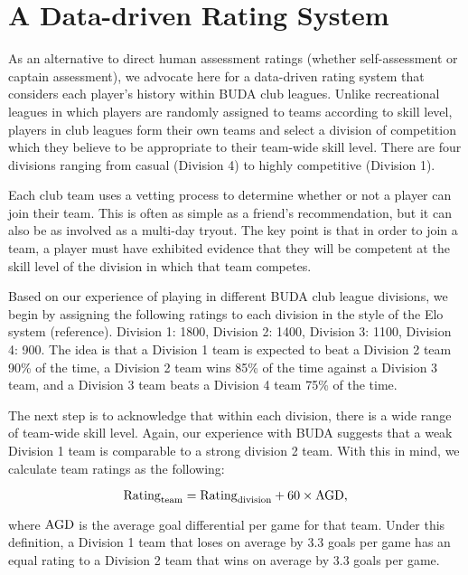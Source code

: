 \section{A Data-driven Rating System}\label{sec:club_rating}

As an alternative to direct human assessment ratings (whether self-assessment or captain assessment), we advocate here for a data-driven rating system that considers each player's history within BUDA club leagues. Unlike recreational leagues in which players are randomly assigned to teams according to skill level, players in club leagues form their own teams and select a division of competition which they believe to be appropriate to their team-wide skill level.  There are four divisions ranging from casual (Division 4) to highly competitive (Division 1).  

Each club team uses a vetting process to determine whether or not a player can join their team. This is often as simple as a friend's recommendation, but it can also be as involved as a multi-day tryout. The key point is that in order to join a team, a player must have exhibited evidence that they will be competent at the skill level of the division in which that team competes.

Based on our experience of playing in different BUDA club league divisions, we begin by assigning the following ratings to each division in the style of the Elo system (reference). Division 1: 1800, Division 2: 1400, Division 3: 1100, Division 4: 900.  The idea is that a Division 1 team is expected to beat a Division 2 team 90\% of the time, a Division 2 team wins 85\% of the time against a Division 3 team, and a Division 3 team beats a Division 4 team 75\% of the time.

The next step is to acknowledge that within each division, there is a wide range of team-wide skill level. Again, our experience with BUDA suggests that a weak Division 1 team is comparable to a strong division 2 team.  With this in mind, we calculate team ratings as the following:

\begin{equation}
{\rm Rating}_{\rm team} = {\rm Rating}_{\rm division} + 60 \times {\rm AGD},
\end{equation}

\noindent where ${\rm AGD}$ is the average goal differential per game for that team.  Under this definition, a Division 1 team that loses on average by 3.3 goals per game has an equal rating to a Division 2 team that wins on average by 3.3 goals per game.

